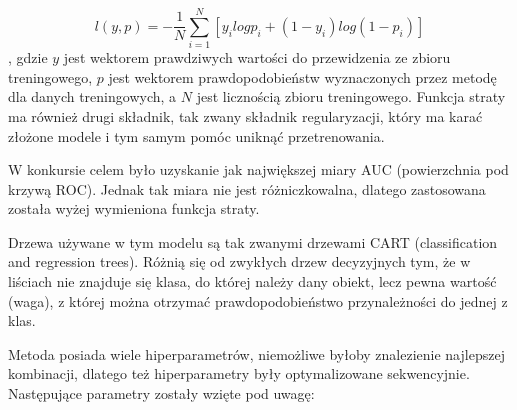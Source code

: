 \documentclass[12pt]{article}
\begin{document}
\begin{equation}
    l(y, p) = -\frac{1}{N} \sum_{i = 1}^{N} \left[ y_i log p_i + (1 - y_i) log (1 - p_i) \right]
\end{equation},
gdzie $y$ jest wektorem prawdziwych wartości do przewidzenia ze zbioru treningowego, $p$ jest wektorem prawdopodobieństw wyznaczonych przez metodę dla danych treningowych, a $N$ jest licznością zbioru treningowego. Funkcja straty ma również drugi składnik, tak zwany składnik regularyzacji, który ma karać złożone modele i tym samym pomóc uniknąć przetrenowania.

W konkursie celem było uzyskanie jak największej miary AUC (powierzchnia pod krzywą ROC). Jednak tak miara nie jest różniczkowalna, dlatego zastosowana została  wyżej wymieniona funkcja straty. 

Drzewa używane w tym modelu są tak zwanymi drzewami CART (classification and regression trees). Różnią się od zwykłych drzew decyzyjnych tym, że w liściach nie znajduje się klasa, do której należy dany obiekt, lecz pewna wartość (waga), z której można otrzymać prawdopodobieństwo przynależności do jednej z klas.

Metoda posiada wiele hiperparametrów, niemożliwe byłoby znalezienie najlepszej kombinacji, dlatego też hiperparametry były optymalizowane sekwencyjnie. Następujące parametry zostały wzięte pod uwagę:
\end{document}
